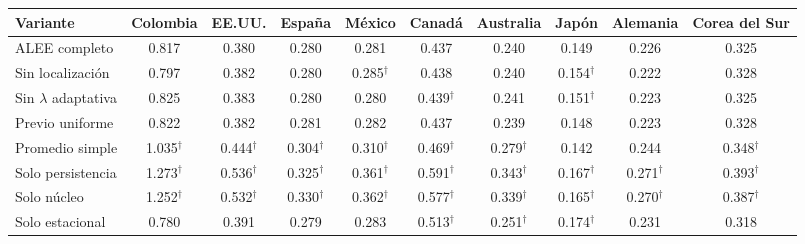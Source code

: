 \begin{tabular}{lccccccccc}
\toprule
Variante & Colombia & EE.UU. & España & México & Canadá & Australia & Japón & Alemania & Corea del Sur \\
\midrule
ALEE completo & 0.817 & 0.380 & 0.280 & 0.281 & 0.437 & 0.240 & 0.149 & 0.226 & 0.325 \\
\midrule
Sin localización & 0.797 & 0.382 & 0.280 & 0.285$^{\dagger}$ & 0.438 & 0.240 & 0.154$^{\dagger}$ & 0.222 & 0.328 \\
Sin $\lambda$ adaptativa & 0.825 & 0.383 & 0.280 & 0.280 & 0.439$^{\dagger}$ & 0.241 & 0.151$^{\dagger}$ & 0.223 & 0.325 \\
Previo uniforme & 0.822 & 0.382 & 0.281 & 0.282 & 0.437 & 0.239 & 0.148 & 0.223 & 0.328 \\
Promedio simple & 1.035$^{\dagger}$ & 0.444$^{\dagger}$ & 0.304$^{\dagger}$ & 0.310$^{\dagger}$ & 0.469$^{\dagger}$ & 0.279$^{\dagger}$ & 0.142 & 0.244 & 0.348$^{\dagger}$ \\
Solo persistencia & 1.273$^{\dagger}$ & 0.536$^{\dagger}$ & 0.325$^{\dagger}$ & 0.361$^{\dagger}$ & 0.591$^{\dagger}$ & 0.343$^{\dagger}$ & 0.167$^{\dagger}$ & 0.271$^{\dagger}$ & 0.393$^{\dagger}$ \\
Solo núcleo & 1.252$^{\dagger}$ & 0.532$^{\dagger}$ & 0.330$^{\dagger}$ & 0.362$^{\dagger}$ & 0.577$^{\dagger}$ & 0.339$^{\dagger}$ & 0.165$^{\dagger}$ & 0.270$^{\dagger}$ & 0.387$^{\dagger}$ \\
Solo estacional & 0.780 & 0.391 & 0.279 & 0.283 & 0.513$^{\dagger}$ & 0.251$^{\dagger}$ & 0.174$^{\dagger}$ & 0.231 & 0.318 \\
\bottomrule
\end{tabular}